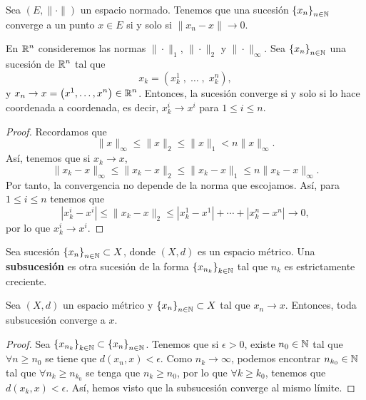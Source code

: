 \begin{observation}
	Sea $\displaystyle \left(E, \| \cdot \| \right) $ un espacio normado. Tenemos que una sucesión $\displaystyle \left\{ x_{n}\right\} _{n\in\mathbb{N}} $ converge a un punto $\displaystyle x \in E $ si y solo si $\displaystyle \| x_{n} - x \| \to 0 $.
\end{observation}
\begin{prop}
	En $\displaystyle \mathbb{R}^{n} $ consideremos las normas $\displaystyle \| \cdot \| _{1} $, $\displaystyle \| \cdot \|_{2} $ y $\displaystyle \| \cdot \|_{\infty} $. Sea $\displaystyle \left\{ x_{n}\right\} _{n\in\mathbb{N}} $ una sucesión de $\displaystyle \mathbb{R}^{n} $ tal que 
	\[x_{k} = \left(x_{k}^{1} \; , \; \ldots \;, \;  x^{n}_{k}\right) ,\]
	y $\displaystyle x_{n} \to x = \left(x^{1}, \ldots, x^{n}\right)\in \mathbb{R}^{n}$. Entonces, la sucesión converge si y solo si lo hace coordenada a coordenada, es decir, $\displaystyle x_{k}^{i} \to x^{i} $ para $\displaystyle 1 \leq i \leq n $.
\end{prop}
\begin{proof}
Recordamos que
\[\| x \|_{\infty} \leq \| x \| _{2} \leq \| x \|_{1} < n\|x\|_{\infty} .\]
Así, tenemos que si $\displaystyle x_{k} \to x $,
\[ \|x_{k}-x\|_{\infty} \leq \|x_{k}-x\|_{2} \leq \|x_{k}-x\|_{1} \leq n\|x_{k}-x\|_{\infty} .\]
Por tanto, la convergencia no depende de la norma que escojamos. Así, para $\displaystyle 1 \leq i \leq n $ tenemos que
\[ \left|x_{k}^{i}-x^{i}\right| \leq \|x_{k}-x\|_{2} \leq \left|x_{k}^{1}-x^{1}\right|+\cdots + \left|x_{k}^{n}-x^{n}\right| \to 0 ,\]
por lo que $\displaystyle x_{k}^{i} \to x^{i} $.
\end{proof}
\begin{definition}[Subsucesión]
	Sea sucesión $\displaystyle \left\{ x_{n}\right\} _{n\in\mathbb{N}} \subset X $, donde $\displaystyle \left(X,d\right) $ es un espacio métrico. Una \textbf{subsucesión} es otra sucesión de la forma $\displaystyle \left\{ x_{n_{k}}\right\} _{k \in \mathbb{N}} $ tal que $\displaystyle n_{k} $ es estrictamente creciente.
\end{definition}
\begin{prop}
	Sea $\displaystyle \left(X,d\right) $ un espacio métrico y $\displaystyle \left\{ x_{n}\right\} _{n\in\mathbb{N}}\subset X $ tal que $\displaystyle x_{n} \to x $. Entonces, toda subsucesión converge a $\displaystyle x $.
\end{prop}
\begin{proof}
	Sea $\displaystyle \left\{ x_{n_{k}}\right\} _{k\in\mathbb{N}} \subset \left\{ x_{n}\right\} _{n\in\mathbb{N}}$. Tenemos que si $\displaystyle \epsilon > 0 $, existe $\displaystyle n_{0} \in \mathbb{N} $ tal que $\displaystyle \forall n \geq n_{0} $ se tiene que $\displaystyle d\left(x_{n}, x\right) < \epsilon  $. Como $\displaystyle n_{k} \to \infty $, podemos encontrar $\displaystyle n_{k_{0}} \in \mathbb{N} $ tal que $\displaystyle \forall n_{k} \geq n_{k_{0}} $ se tenga que $\displaystyle n_{k} \geq n_{0} $, por lo que $\displaystyle \forall k \geq k_{0} $, tenemos que $\displaystyle d\left(x_{k}, x\right) < \epsilon $.
	Así, hemos visto que la subsucesión converge al mismo límite.
\end{proof}
